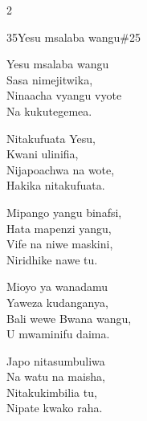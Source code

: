 \documentclass{article}
\begin{document}
\begin{multicols}{2}
\begin{hymn}{35}{Yesu msalaba wangu}{\#25}
\begin{stanza}
Yesu msalaba wangu\\
Sasa nimejitwika,\\
Ninaacha vyangu vyote\\
Na kukutegemea.
\end{stanza}
\begin{chorus}
Nitakufuata Yesu,\\
Kwani ulinifia,\\
Nijapoachwa na wote,\\
Hakika nitakufuata.
\end{chorus}
\begin{stanza}
Mipango yangu binafsi,\\
Hata mapenzi yangu,\\
Vife na niwe maskini,\\
Niridhike nawe tu.
\end{stanza}
\begin{stanza}
Mioyo ya wanadamu\\
Yaweza kudanganya,\\
Bali wewe Bwana wangu,\\
U mwaminifu daima.
\end{stanza}
\begin{stanza}
Japo nitasumbuliwa\\
Na watu na maisha,\\
Nitakukimbilia tu,\\
Nipate kwako raha.
\end{stanza}
\end{hymn}


\end{multicols}
\end{document}
